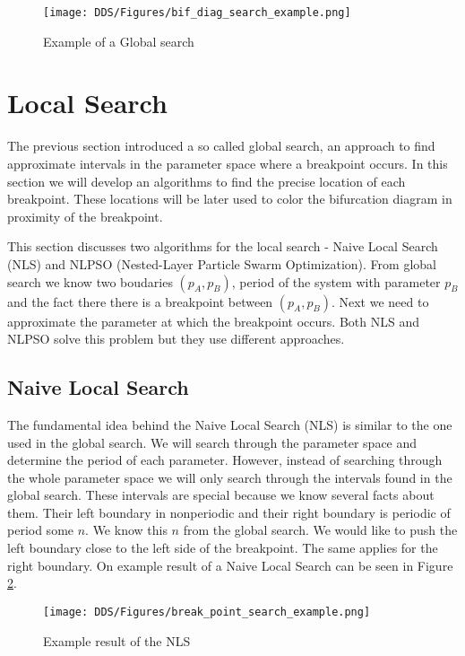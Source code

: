 \begin{figure}[!h]
    \centering
    \texttt{[image: DDS/Figures/bif\_diag\_search\_example.png]}
    \caption{Example of a Global search}
    \label{fig:bif_diag_search_example}
\end{figure}

\section{Local Search}
The previous section introduced a so called global search, an approach to find approximate intervals in the parameter space where a breakpoint occurs.
In this section we will develop an algorithms to find the precise location of each breakpoint.
These locations will be later used to color the bifurcation diagram in proximity of the breakpoint.
\par
This section discusses two algorithms for the local search - Naive Local Search (NLS) and NLPSO (Nested-Layer Particle Swarm Optimization).
From global search we know two boudaries $(p_A, p_B)$, period of the system with parameter $p_B$ and the fact there there is a breakpoint between $(p_A, p_B)$.
Next we need to approximate the parameter at which the breakpoint occurs.
Both NLS and NLPSO solve this problem but they use different approaches.

\subsection{Naive Local Search}
The fundamental idea behind the Naive Local Search (NLS) is similar to the one used in the global search.
We will search through the parameter space and determine the period of each parameter.
However, instead of searching through the whole parameter space we will only search through the intervals found in the global search.
These intervals are special because we know several facts about them.
Their left boundary in nonperiodic and their right boundary is periodic of period some $n$. We know this $n$ from the global search.
We would like to push the left boundary close to the left side of the breakpoint.
The same applies for the right boundary.
On example result of a Naive Local Search can be seen in Figure \ref{fig:break_point_search_example}.

\begin{figure}[!h]
    \centering
    \texttt{[image: DDS/Figures/break\_point\_search\_example.png]}
    \caption{Example result of the NLS}
    \label{fig:break_point_search_example}
\end{figure}



